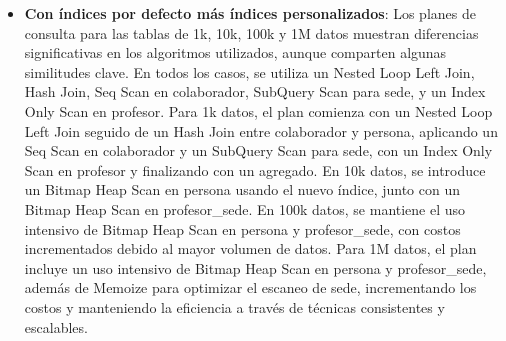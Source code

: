 \begin{itemize}
\begin{itemize}
		      \item {\textbf{Con índices por defecto más índices personalizados}: Los planes de consulta para las tablas de 1k, 10k, 100k y 1M datos muestran diferencias significativas en los algoritmos utilizados, aunque comparten algunas similitudes clave. En todos los casos, se utiliza un Nested Loop Left Join, Hash Join, Seq Scan en colaborador, SubQuery Scan para sede, y un Index Only Scan en profesor. Para 1k datos, el plan comienza con un Nested Loop Left Join seguido de un Hash Join entre colaborador y persona, aplicando un Seq Scan en colaborador y un SubQuery Scan para sede, con un Index Only Scan en profesor y finalizando con un agregado. En 10k datos, se introduce un Bitmap Heap Scan en persona usando el nuevo índice, junto con un Bitmap Heap Scan en profesor\_sede. En 100k datos, se mantiene el uso intensivo de Bitmap Heap Scan en persona y profesor\_sede, con costos incrementados debido al mayor volumen de datos. Para 1M datos, el plan incluye un uso intensivo de Bitmap Heap Scan en persona y profesor\_sede, además de Memoize para optimizar el escaneo de sede, incrementando los costos y manteniendo la eficiencia a través de técnicas consistentes y escalables.}
	      \end{itemize}
\end{itemize}
